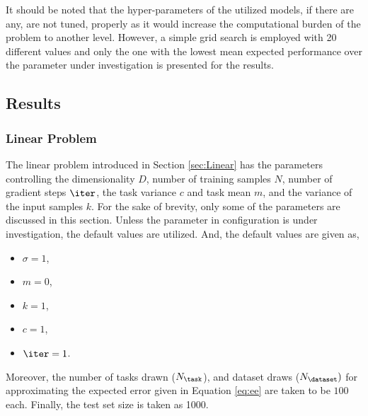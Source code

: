 It should be noted that the hyper-parameters of the utilized models, if there are any, are not tuned, properly as it would increase the computational burden of the problem to another level. However, a simple grid search is employed with 20 different values and only the one with the lowest mean expected performance over the parameter under investigation is presented for the results. 

\subsection{Results}

\subsubsection{Linear Problem}
The linear problem introduced in Section \ref{sec:Linear} has the parameters controlling the dimensionality $D$, number of training samples $N$, number of gradient steps $\iter$, the task variance $c$ and task mean $m$, and the variance of the input samples $k$. For the sake of brevity, only some of the parameters are discussed in this section. Unless the parameter in configuration is under investigation, the default values are utilized. And, the default values are given as,
\begin{itemize}
  \item $\sigma=1$,
  \item $m=0$,
  \item $k=1$,
  \item $c=1$,
  \item $\iter=1$.
\end{itemize}
Moreover, the number of tasks drawn ($N_{\task}$), and dataset draws ($N_{\dataset})$  for approximating the expected error given in Equation \ref{eq:ee} are taken to be $100$ each. Finally, the test set size is taken as 1000.

